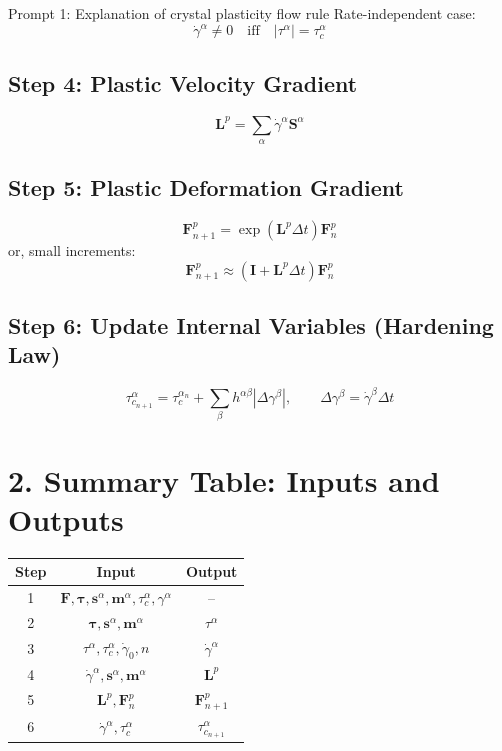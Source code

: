\documentclass[12pt]{article}
\begin{document}
\begin{summary}{Prompt 1: Explanation of crystal plasticity flow rule}
Rate-independent case:
\[
\dot{\gamma}^\alpha \neq 0 \quad \text{iff} \quad |\tau^\alpha| = \tau_c^\alpha
\]



\subsection*{Step 4: Plastic Velocity Gradient}
\[
\mathbf{L}^p = \sum_\alpha \dot{\gamma}^\alpha \mathbf{S}^\alpha
\]

\subsection*{Step 5: Plastic Deformation Gradient}
\[
\mathbf{F}^p_{n+1} = \exp(\mathbf{L}^p \Delta t)\mathbf{F}^p_n
\]
or, small increments:
\[
\mathbf{F}^p_{n+1} \approx (\mathbf{I} + \mathbf{L}^p \Delta t)\mathbf{F}^p_n
\]

\subsection*{Step 6: Update Internal Variables (Hardening Law)}
\[
\tau_{c_{n+1}}^\alpha = \tau_c^{\alpha_n} + \sum_\beta h^{\alpha\beta} |\Delta \gamma^\beta|,
\qquad \Delta \gamma^\beta = \dot{\gamma}^\beta \Delta t
\]

\section*{2. Summary Table: Inputs and Outputs}
\begin{tabular}{|c|c|c|}
\hline
\textbf{Step} & \textbf{Input} & \textbf{Output} \\
\hline
1 & \( \mathbf{F}, \boldsymbol{\tau}, \mathbf{s}^\alpha, \mathbf{m}^\alpha, \tau_c^\alpha, \gamma^\alpha \) & -- \\
2 & \( \boldsymbol{\tau}, \mathbf{s}^\alpha, \mathbf{m}^\alpha \) & \( \tau^\alpha \) \\
3 & \( \tau^\alpha, \tau_c^\alpha, \dot{\gamma}_0, n \) & \( \dot{\gamma}^\alpha \) \\
4 & \( \dot{\gamma}^\alpha, \mathbf{s}^\alpha, \mathbf{m}^\alpha \) & \( \mathbf{L}^p \) \\
5 & \( \mathbf{L}^p, \mathbf{F}^p_n \) & \( \mathbf{F}^p_{n+1} \) \\
6 & \( \dot{\gamma}^\alpha, \tau_c^\alpha \) & \( \tau_{c_{n+1}}^{\alpha} \) \\
\hline
\end{tabular}



\end{summary}
\end{document}
